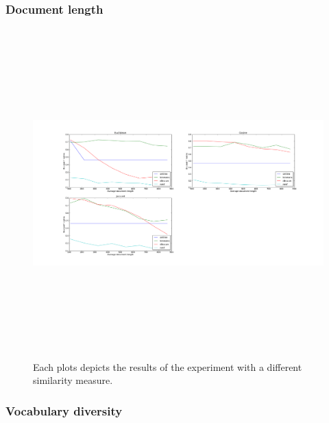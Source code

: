 \subsubsection{Document length}
\begin{figure}[htbp]
  \begin{center}
    \includegraphics[height=5in, width=6in]{average_document_length}
    \caption{Each plots depicts the results of the experiment with a different similarity measure.}
    \label{DifferentLengthResults}
  \end{center}
\end{figure}

\subsubsection{Vocabulary diversity}

